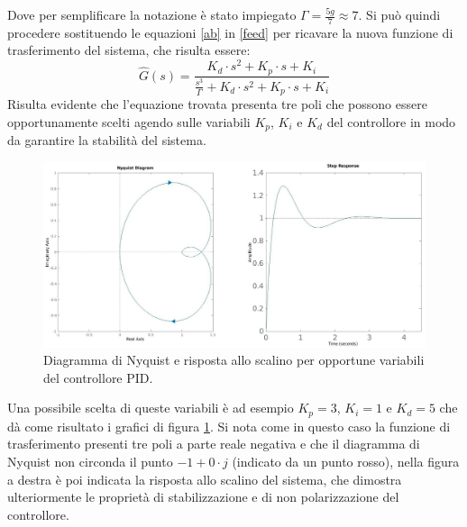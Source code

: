 \documentclass[12pt,twoside,openright]{report}
\begin{document}
Dove per semplificare la notazione è stato impiegato $\Gamma=\frac{5g}{7}\approx 7$. Si può quindi procedere sostituendo le equazioni \eqref{ab} in \eqref{feed} per ricavare la nuova funzione di trasferimento del sistema, che risulta essere:
\begin{equation}\label{transferaaaa}
\hat G(s)= \frac{K_d\cdot s^2+K_p\cdot s+ K_i}{\frac{s^3}{\Gamma}+K_d\cdot s^2+K_p\cdot s+ K_i}
\end{equation}
Risulta evidente che l'equazione trovata presenta tre poli che possono essere opportunamente scelti agendo sulle variabili $K_p$, $K_i$ e $K_d$ del controllore in modo da garantire la stabilità del sistema. 
\begin{figure}[h!]
\centering
\includegraphics[width=\textwidth]{step3.jpg}
\caption{Diagramma di Nyquist e risposta allo scalino per opportune variabili del controllore PID.} \label{fig:nyquist}
\end{figure}
Una possibile scelta di queste variabili è ad esempio $K_p=3$, $K_i=1$ e $K_d=5$ che dà come risultato i grafici di figura \ref{fig:nyquist}. Si nota come in questo caso la funzione di trasferimento presenti tre poli a parte reale negativa e che il diagramma di Nyquist non circonda il punto $-1+0\cdot j$ (indicato da un punto rosso), nella figura a destra è poi indicata la risposta allo scalino del sistema, che dimostra ulteriormente le proprietà di stabilizzazione e di non polarizzazione del controllore.

\end{document}
